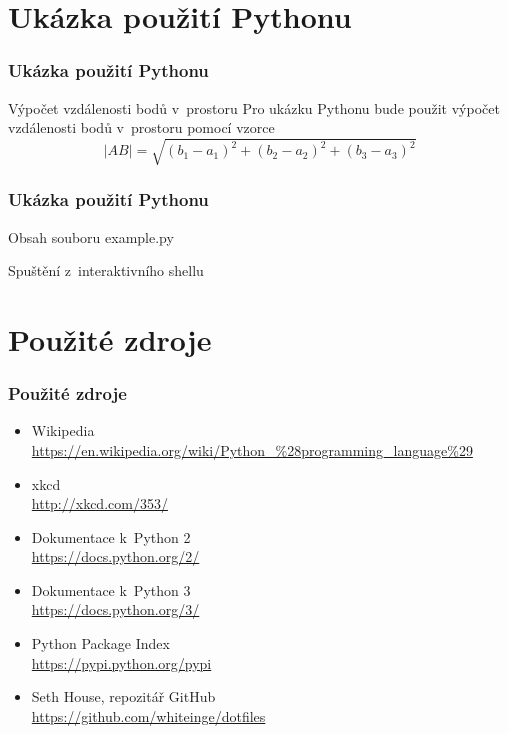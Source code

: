 \documentclass[color=rose,utf8]{beamer}
\newcommand{\myurl}[1]{{\scriptsize\color{blue}\url{#1}}}
\begin{document}

  \section{Ukázka použití Pythonu}
  \begin{frame}[t]
    \frametitle{Ukázka použití Pythonu}
    \begin{block}{Výpočet vzdálenosti bodů v~prostoru}
      Pro ukázku Pythonu bude použit výpočet vzdálenosti bodů v~prostoru
      pomocí vzorce
      \[|AB| = \sqrt{(b_{1} - a_{1})^{2} +
                     (b_{2} - a_{2})^{2} +
                     (b_{3} - a_{3})^{2}
                    }
      \]
    \end{block}
  \end{frame}
  \begin{frame}[t]
    \frametitle{Ukázka použití Pythonu}
    \begin{exampleblock}{Obsah souboru example.py}
      \pythonexample
    \end{exampleblock}
    \begin{exampleblock}{Spuštění z~interaktivního shellu}
      \pythonuseexample      
    \end{exampleblock}
  \end{frame}


  \section{Použité zdroje}
  \begin{frame}[t]
    \frametitle{Použité zdroje}
    \begin{itemize}
      \item Wikipedia \\
        \myurl{
          https://en.wikipedia.org/wiki/Python\_\%28programming\_language\%29
        } 
      \item xkcd \\ \myurl{http://xkcd.com/353/}
      \item Dokumentace k~Python 2 \\ \myurl{https://docs.python.org/2/}
      \item Dokumentace k~Python 3 \\ \myurl{https://docs.python.org/3/}
      \item Python Package Index \\ \myurl{https://pypi.python.org/pypi}
      \item Seth House, repozitář GitHub \\ 
        \myurl{https://github.com/whiteinge/dotfiles}
    \end{itemize}
  \end{frame}

\end{document}
